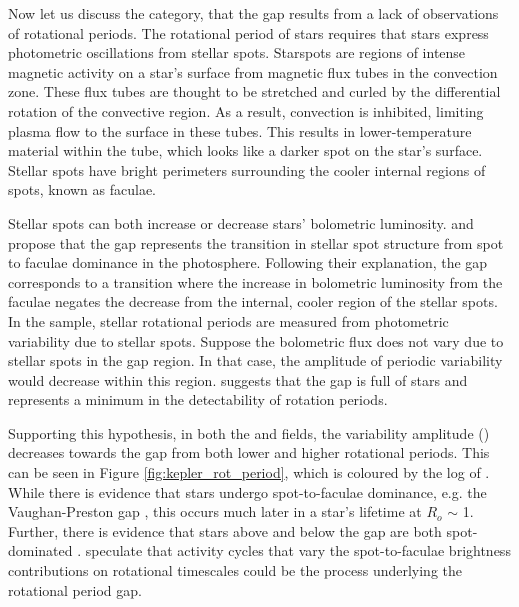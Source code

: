 Now let us discuss the  category, that the gap results from a lack of observations of rotational periods.
The rotational period of \kepler{} stars requires that stars express photometric oscillations from stellar spots.
Starspots are regions of intense magnetic activity on a star's surface from magnetic flux tubes in the convection zone. 
These flux tubes are thought to be stretched and curled by the differential rotation of the convective region. 
As a result, convection is inhibited, limiting plasma flow to the surface in these tubes.
This results in lower-temperature material within the tube, which looks like a darker spot on the star's surface.
Stellar spots have bright perimeters surrounding the cooler internal regions of spots, known as faculae.

Stellar spots can both increase or decrease stars' bolometric luminosity.
 \citet{reinhold_fast_2013} and \citet{reinhold_transition_2019} propose that the gap represents the transition in stellar spot structure from spot to faculae dominance in the photosphere.
Following their explanation, the gap corresponds to a transition where the increase in bolometric luminosity from the faculae negates the decrease from the internal, cooler region of the stellar spots. 
In the \citet{mcquillan_rotation_2014} sample, stellar rotational periods are measured from photometric variability due to stellar spots.
Suppose the bolometric flux does not vary due to stellar spots in the gap region. 
In that case, the amplitude of periodic variability would decrease within this region.
\citet{reinhold_transition_2019} suggests that the gap is full of stars and represents a minimum in the detectability of rotation periods.

Supporting this hypothesis, in both the \kepler{} and \ktoo{} fields, the variability amplitude (\rper) decreases towards the gap from both lower and higher rotational periods.
This can be seen in Figure \ref{fig:kepler_rot_period}, which is coloured by the log of \rper.
While there is evidence that stars undergo spot-to-faculae dominance, e.g. the Vaughan-Preston gap \citep{vaughan_survey_1980}, this occurs much later in a star's lifetime at $R_o$ $\sim$ 1.
Further, there is evidence that stars above and below the gap are both spot-dominated  \citep{lockwood_patterns_2007, reinhold_transition_2019}.
\citet{reinhold_transition_2019} speculate that activity cycles that vary the spot-to-faculae brightness contributions on rotational timescales could be the process underlying the rotational period gap.

